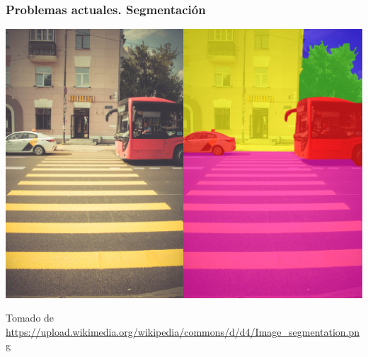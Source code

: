 \documentclass[
10pt, %
aspectratio=169, %
]{beamer}
\begin{document}
	\begin{frame}
		
		\frametitle{Problemas actuales. Segmentación}
		
		\centering
		\includegraphics[scale=0.14]{segmentacion.png} 
		
		{\scriptsize Tomado de \url{https://upload.wikimedia.org/wikipedia/commons/d/d4/Image_segmentation.png}}
		
	\end{frame}
	
\end{document}

